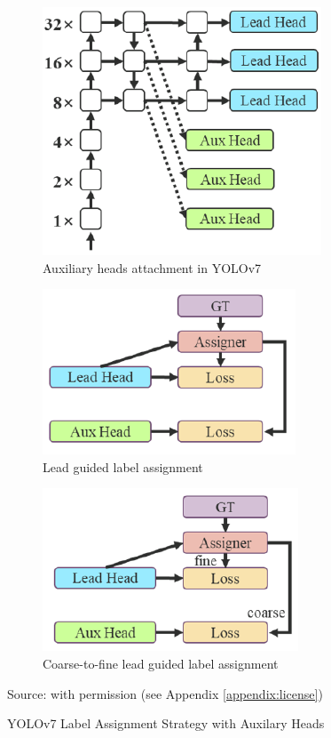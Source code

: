   \begin{figure}[t!]
      \centering

      \begin{subfigure}[][][t]{\textwidth}
        \centering
        \includegraphics[width=.33\linewidth]{figures/auxilary-head.png}
        \caption{Auxiliary heads attachment in YOLOv7}
        \label{fig:aux-head}
      \end{subfigure}

      \begin{subfigure}[][][t]{0.49\textwidth}
        \centering
        \includegraphics[width=.66\linewidth]{figures/lead-head-assigner.png}
        \caption{Lead guided label assignment}
        \label{fig:lead-head}
      \end{subfigure}
      \begin{subfigure}[][][t]{0.49\textwidth}
        \centering
        \includegraphics[width=.66\linewidth]{figures/coarse-to-fine.png}
        \caption{Coarse-to-fine lead guided label assignment}
        \label{fig:coarse-to-fine}
      \end{subfigure}
      \caption*{Source: \textcite{yolov7} with permission (see Appendix \ref{appendix:license})} %
      \caption{YOLOv7 Label Assignment Strategy with Auxilary Heads}
      \label{fig:labelassigner}
  \end{figure}

